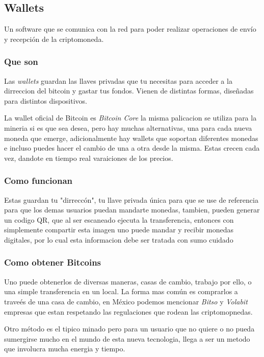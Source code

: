 \documentclass[12pt,letterpaper]{article}
\begin{document}
            \subsection*{Wallets}
Un software que se comunica con la red para poder realizar operaciones de env\'io y recepci\'on de la criptomoneda.
                \subsubsection*{Que son}
                Las \textit{wallets} guardan las llaves privadas que tu necesitas para acceder a la dirreccion del bitcoin y gastar tus fondos. Vienen de distintas formas, dise\~nadas para distintos dispositivos.
                
                La wallet oficial de Bitcoin es \textit{Bitcoin Core} la misma palicacion se utiliza para la mineria si es que sea desea, pero hay muchas alternativas, una para cada nueva moneda que emerge, adicionalmente hay wallets que soportan diferentes monedas e incluso puedes hacer el cambio de una a otra desde la misma. Estas crecen cada vez, dandote en tiempo real varaiciones de los precios.
                \subsubsection*{Como funcionan}
				Estas guardan tu "dirrecc\'on", tu llave privada \'unica para que se use de referencia para que los demas usuarios puedan mandarte monedas, tambien, pueden generar un codigo QR, que al ser escaneado ejecuta la transferencia, entonces con simplemente compartir esta imagen uno puede mandar y recibir monedas digitales, por lo cual esta informacion debe ser tratada con sumo cuidado                                
            \subsubsection*{Como obtener Bitcoins}
	Uno puede obtenerlos de diversas maneras, casas de cambio, trabajo por ello, o una simple transferencia en un local. La forma mas com\'un es comprarlos a trave\'es de una casa de cambio, en M\'exico podemos mencionar \textit{Bitso} y \textit{Volabit} empresas que estan respetando las regulaciones que rodean las criptomopnedas.
	
	Otro m\'etodo es el tipico minado pero para un usuario que no quiere o no pueda sumergirse mucho en el mundo de esta nueva tecnologia, llega a ser un metodo que involucra mucha energia y tiempo.
	
\end{document}
